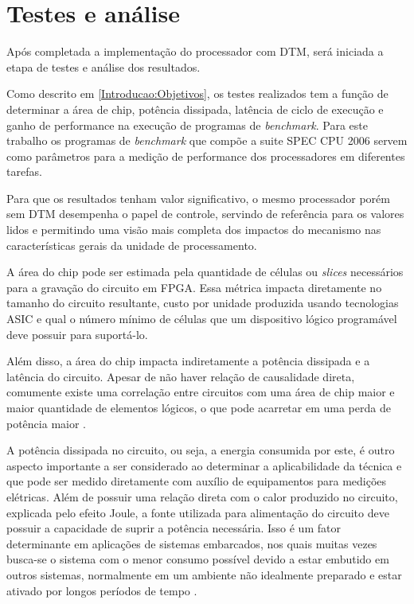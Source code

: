 \section{Testes e análise}
\label{Metodologia:Analise}

Após completada a implementação do processador com DTM, será iniciada a etapa de testes e análise dos resultados. 


Como descrito em \ref{Introducao:Objetivos}, os testes realizados tem a função de determinar a área de chip, potência dissipada, latência de ciclo de execução e ganho de performance na execução de programas de \textit{benchmark}. Para este trabalho os programas de \textit{benchmark} que compõe a suite SPEC CPU 2006 servem como parâmetros para a medição de performance dos processadores em diferentes tarefas.

Para que os resultados tenham valor significativo, o mesmo processador porém sem DTM desempenha o papel de controle, servindo de referência para os valores lidos e permitindo uma visão mais completa dos impactos do mecanismo nas características gerais da unidade de processamento.

A área do chip pode ser estimada pela quantidade de células ou \textit{slices} necessários para a gravação do circuito em FPGA. Essa métrica impacta diretamente no tamanho do circuito resultante, custo por unidade produzida usando tecnologias ASIC e qual o número mínimo de células que um dispositivo lógico programável deve possuir para suportá-lo.

Além disso, a área do chip impacta indiretamente a potência dissipada e a latência do circuito. Apesar de não haver relação de causalidade direta, comumente existe uma correlação entre circuitos com uma área de chip maior e maior quantidade de elementos lógicos, o que pode acarretar em uma perda de potência maior \cite{chu2006rtl}.

A potência dissipada no circuito, ou seja, a energia consumida por este, é outro aspecto importante a ser considerado ao determinar a aplicabilidade da técnica e que pode ser medido diretamente com auxílio de equipamentos para medições elétricas. Além de possuir uma relação direta com o calor produzido no circuito, explicada pelo efeito Joule, a fonte utilizada para alimentação do circuito deve possuir a capacidade de suprir a potência necessária. Isso é um fator determinante em aplicações de sistemas embarcados, nos quais muitas vezes busca-se o sistema com o menor consumo possível devido a estar embutido em outros sistemas, normalmente em um ambiente não idealmente preparado e estar ativado por longos períodos de tempo \cite{tanenbaum2009organizacao}.

